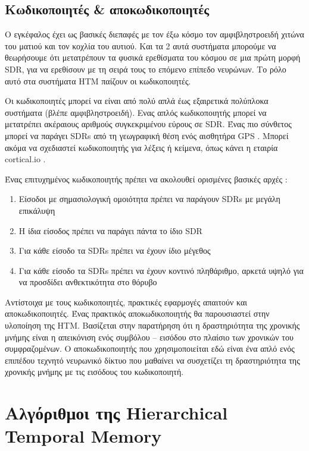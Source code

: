 \subsection{Κωδικοποιητές \& αποκωδικοποιητές}

	Ο εγκέφαλος έχει ως βασικές διεπαφές με τον έξω κόσμο τον αμφιβληστροειδή χιτώνα του ματιού και τον κοχλία του αυτιού.
	Και τα 2 αυτά συστήματα μπορούμε να θεωρήσουμε ότι μετατρέπουν τα φυσικά ερεθίσματα του κόσμου σε μια πρώτη μορφή SDR,
	για να ερεθίσουν με τη σειρά τους το επόμενο επίπεδο νευρώνων.
	Το ρόλο αυτό στα συστήματα HTM παίζουν οι κωδικοποιητές.

	Οι κωδικοποιητές μπορεί να είναι από πολύ απλά έως εξαιρετικά πολύπλοκα συστήματα (βλέπε αμφιβληστροειδή).
	Ενας απλός κωδικοποιητής μπορεί να μετατρέπει ακέραιους αριθμούς συγκεκριμένου εύρους σε SDR.
	Ένας πιο σύνθετος μπορεί να παράγει SDRs από τη γεωγραφική θέση ενός αισθητήρα GPS \parencite{purdyEncodingDataHTM2016}.
	Μπορεί ακόμα να σχεδιαστεί κωδικοποιητής για λέξεις ή κείμενα, όπως κάνει η εταιρία cortical.io \parencite{semantic}.

	Ένας επιτυχημένος κωδικοποιητής πρέπει να ακολουθεί ορισμένες βασικές αρχές \parencite{purdyEncodingDataHTM2016}:
	\begin{enumerate}
		\item Είσοδοι με σημασιολογική ομοιότητα πρέπει να παράγουν SDRs με μεγάλη επικάλυψη
		\item Η ίδια είσοδος πρέπει να παράγει πάντα το ίδιο SDR
		\item Για κάθε είσοδο τα SDRs πρέπει να έχουν ίδιο μέγεθος
		\item Για κάθε είσοδο τα SDRs πρέπει να έχουν κοντινό πληθάριθμο, αρκετά υψηλό για να προσδίδει ανθεκτικότητα στο θόρυβο
	\end{enumerate}

	Αντίστοιχα με τους κωδικοποιητές, πρακτικές εφαρμογές απαιτούν και αποκωδικοποιητές.
	Ένας πρακτικός αποκωδικοποιητής θα παρουσιαστεί στην υλοποίηση της HTM.
	Βασίζεται στην παρατήρηση ότι η δραστηριότητα της χρονικής μνήμης είναι η απεικόνιση ενός συμβόλου -- εισόδου στο πλαίσιο των χρονικών του συμφραζομένων.
	Ο αποκωδικοποιητής που χρησιμοποιείται εδώ είναι ένα απλό ενός επιπέδου τεχνητό νευρωνικό δίκτυο που μαθαίνει να συσχετίζει
	τη δραστηριότητα της χρονικής μνήμης με τις εισόδους του κωδικοποιητή.


\section{Αλγόριθμοι της Hierarchical Temporal Memory}

